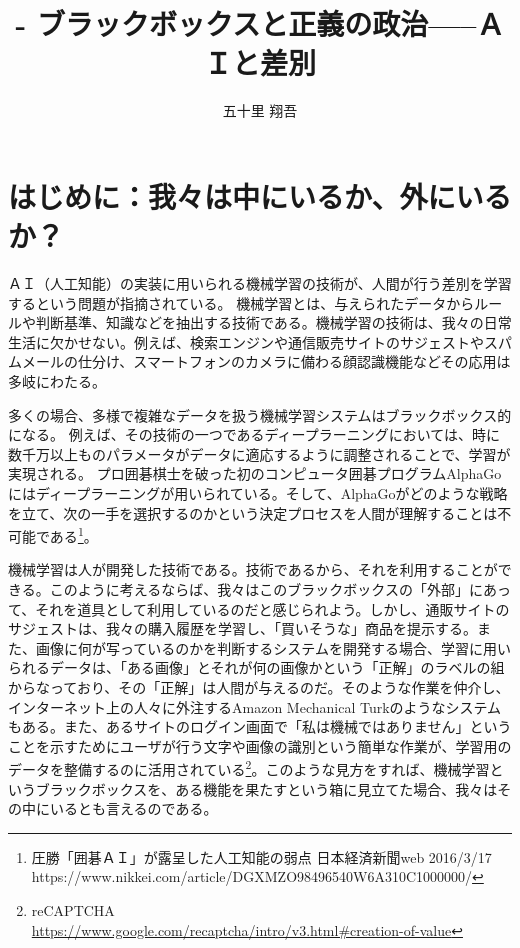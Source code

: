 \documentclass[b5j,twoside,twocolumn]{utarticle}
\title{-\tbaselineshift=4.0pt ブラックボックスと正義の政治-----ＡＩと差別}
\author{五十里 翔吾}
\date{\vspace{-5mm}}
\newcommand{\mysection}[1]{\vspace{-5mm}\section{#1}\vspace{-2mm}}
\begin{document}

\maketitle


\setlength{\footskip}{-2mm}
\chead[]{}
\lfoot[]{\thepage{}}
\cfoot[]{}
\rfoot[\thepage{}]{}

\thispagestyle{fancy}
\renewcommand{\footnoterule}{\noindent\rule{100mm}{0.3mm}\vskip2mm}


\mysection{はじめに：我々は中にいるか、外にいるか？}
ＡＩ（人工知能）の実装に用いられる機械学習の技術が、人間が行う差別を学習するという問題が指摘されている。
機械学習とは、与えられたデータからルールや判断基準、知識などを抽出する技術である。機械学習の技術は、我々の日常生活に欠かせない。例えば、検索エンジンや通信販売サイトのサジェストやスパムメールの仕分け、スマートフォンのカメラに備わる顔認識機能などその応用は多岐にわたる。


多くの場合、多様で複雑なデータを扱う機械学習システムはブラックボックス的になる。
例えば、その技術の一つであるディープラーニングにおいては、時に数千万以上ものパラメータがデータに適応するように調整されることで、学習が実現される。
プロ囲碁棋士を破った初のコンピュータ囲碁プログラムAlphaGoにはディープラーニングが用いられている。そして、AlphaGoがどのような戦略を立て、次の一手を選択するのかという決定プロセスを人間が理解することは不可能である\footnote{圧勝「囲碁ＡＩ」が露呈した人工知能の弱点 日本経済新聞web 2016/3/17 https://www.nikkei.com/article/DGXMZO98496540W6A310C1000000/}。


機械学習は人が開発した技術である。技術であるから、それを利用することができる。このように考えるならば、我々はこのブラックボックスの「外部」にあって、それを道具として利用しているのだと感じられよう。しかし、通販サイトのサジェストは、我々の購入履歴を学習し、「買いそうな」商品を提示する。また、画像に何が写っているのかを判断するシステムを開発する場合、学習に用いられるデータは、「ある画像」とそれが何の画像かという「正解」のラベルの組からなっており、その「正解」は人間が与えるのだ。そのような作業を仲介し、インターネット上の人々に外注するAmazon Mechanical Turkのようなシステムもある。また、あるサイトのログイン画面で「私は機械ではありません」ということを示すためにユーザが行う文字や画像の識別という簡単な作業が、学習用のデータを整備するのに活用されている\footnote{reCAPTCHA\\\url{https://www.google.com/recaptcha/intro/v3.html#creation-of-value}}。このような見方をすれば、機械学習というブラックボックスを、ある機能を果たすという箱に見立てた場合、我々はその中にいるとも言えるのである。
\end{document}
